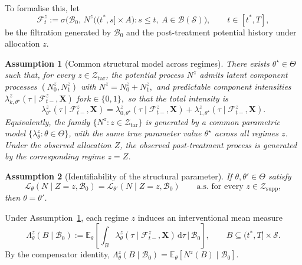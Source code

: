 \documentclass{statsoc}
\newtheorem{assumption}[assumption]{Assumption}
\newcommand{\bbE}{\mathbb{E}}
\newcommand{\dd}{\mathrm{d}}
\newcommand{\1}{\mathbbm{1}}
\newcommand{\CovX}{\mathbf{X}}
\newcommand{\Nproc}{N}
\newcommand{\Nzero}{N_0}
\newcommand{\None}{N_1}
\begin{document}
To formalise this, let
\[
\mathcal F_t^z
:=
\sigma\!\Big(
\mathcal B_0,\,
\Nproc^z\big((t^\ast,s]\times A\big):s\le t,\ A\in\mathcal B(\mathcal S)
\Big),
\qquad t\in[t^\ast,T],
\]
be the filtration generated by \(\mathcal B_0\) and the post-treatment potential history under allocation \(z\).

\begin{assumption}[Common structural model across regimes]\label{ass:id-structural}
There exists \(\theta^\star\in\Theta\) such that, for every \(z\in\mathcal Z_{\mathrm{tar}}\), the potential process \(\Nproc^z\) admits latent component processes \((\Nzero^z,\None^z)\) with
\(
\Nproc^z=\Nzero^z+\None^z,
\)
and predictable component intensities
\(
\lambda_{k,\theta^\star}^z(\tau\mid \mathcal F_{t-}^z,\CovX)\) for\( k\in\{0,1\},
\)
so that the total intensity is
\[
\lambda_{\theta^\star}^z(\tau\mid \mathcal F_{t-}^z,\CovX)
=
\lambda_{0,\theta^\star}^z(\tau\mid \mathcal F_{t-}^z,\CovX)
+
\lambda_{1,\theta^\star}^z(\tau\mid \mathcal F_{t-}^z,\CovX).
\]
Equivalently, the family \(\{\Nproc^z:z\in\mathcal Z_{\mathrm{tar}}\}\) is generated by a common parametric model \(\{\lambda_\theta^z:\theta\in\Theta\}\), with the same true parameter value \(\theta^\star\) across all regimes \(z\). Under the observed allocation \(Z\), the observed post-treatment process is generated by the corresponding regime \(z=Z\).
\end{assumption}

\begin{assumption}[Identifiability of the structural parameter]\label{ass:id-theta}
If \(\theta,\theta'\in\Theta\) satisfy
\[
\mathcal L_\theta\!\left(\Nproc\mid Z=z,\mathcal B_0\right)
=
\mathcal L_{\theta'}\!\left(\Nproc\mid Z=z,\mathcal B_0\right)
\qquad\text{a.s. for every } z\in\mathcal Z_{\mathrm{supp}},
\]
then \(\theta=\theta'\).
\end{assumption}

Under Assumption~\ref{ass:id-structural}, each regime \(z\) induces an interventional mean measure
\begin{equation}\label{eq:id-mean-measure}
\Lambda_\theta^z(B\mid \mathcal B_0)
:=
\bbE_\theta\!\left[
\int_B \lambda_\theta^z(\tau\mid \mathcal F_{t-}^z,\CovX)\,\dd\tau
\,\Big|\, \mathcal B_0
\right],
\qquad B\subseteq (t^\ast,T]\times\mathcal S.
\end{equation}
By the compensator identity, \(\Lambda_\theta^z(B\mid \mathcal B_0)=\bbE_\theta[\Nproc^z(B)\mid \mathcal B_0]\).
\end{document}
